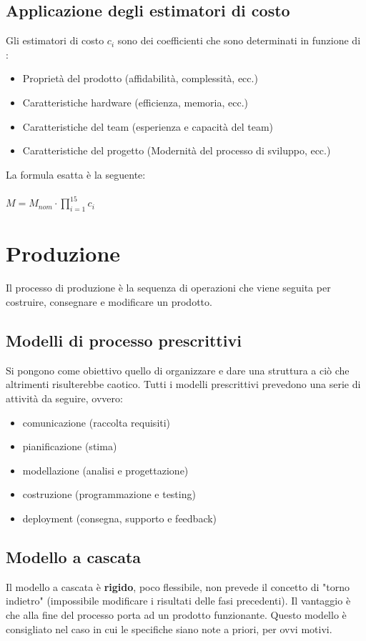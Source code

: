 \documentclass[a4paper,12pt]{report}
\begin{document}
	\subsection{Applicazione degli estimatori di costo}
	Gli estimatori di costo $c_i$ sono dei coefficienti che sono determinati in funzione di :
	\begin{itemize}
		\item Proprietà del prodotto (affidabilità, complessità, ecc.)
		\item Caratteristiche hardware (efficienza, memoria, ecc.)
		\item Caratteristiche del team (esperienza e capacità del team)
		\item Caratteristiche del progetto (Modernità del processo di sviluppo, ecc.)
	\end{itemize}
	La formula esatta è la seguente:\\\\
	$M = M_{nom} \cdot \prod_{i = 1}^{15}c_i$
	\section{Produzione}
	Il processo di produzione è la sequenza di operazioni che viene seguita per costruire, consegnare e modificare un prodotto.
	\subsection{Modelli di processo prescrittivi}
	Si pongono come obiettivo quello di organizzare e dare una struttura a ciò che altrimenti risulterebbe caotico. Tutti i modelli prescrittivi prevedono una serie di attività da seguire, ovvero: 
	\begin{itemize}
		\item comunicazione (raccolta requisiti)
		\item pianificazione (stima)
		\item modellazione (analisi e progettazione)
		\item costruzione (programmazione e testing)
		\item deployment (consegna, supporto e feedback)
	\end{itemize}
	\subsection{Modello a cascata}
	Il modello a cascata è \textbf{rigido}, poco flessibile, non prevede il concetto di "torno indietro" (impossibile modificare i risultati delle fasi precedenti). Il vantaggio è che alla fine del processo porta ad un prodotto funzionante. Questo modello è consigliato nel caso in cui le specifiche siano note a priori, per ovvi motivi.
\end{document}
